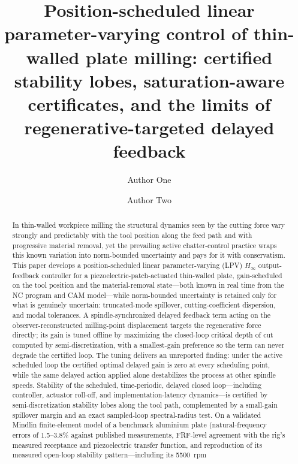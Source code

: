 \documentclass[preprint,12pt]{elsarticle}
\newcommand{\hinf}{H_\infty}
\begin{document}
\begin{frontmatter}

\title{Position-scheduled linear parameter-varying control of
thin-walled plate milling: certified stability lobes,
saturation-aware certificates, and the limits of
regenerative-targeted delayed feedback}

\author{Author One}
\author{Author Two}

\begin{abstract}
In thin-walled workpiece milling the structural dynamics seen by the
cutting force vary strongly and predictably with the tool position along
the feed path and with progressive material removal, yet the prevailing
active chatter-control practice wraps this known variation into
norm-bounded uncertainty and pays for it with conservatism. This paper
develops a position-scheduled linear parameter-varying (LPV) $\hinf$
output-feedback controller for a piezoelectric-patch-actuated thin-walled
plate, gain-scheduled on the tool position and the material-removal
state---both known in real time from the NC program and CAM model---while
norm-bounded uncertainty is retained only for what is genuinely
uncertain: truncated-mode spillover, cutting-coefficient dispersion, and
modal tolerances. A spindle-synchronized delayed feedback term acting on
the observer-reconstructed milling-point displacement targets the
regenerative force directly; its gain is tuned offline by maximizing
the closed-loop critical depth of cut computed by semi-discretization,
with a smallest-gain preference so the term can never degrade the
certified loop. The tuning delivers an unreported finding: under the
active scheduled loop the certified optimal delayed gain is zero at
every scheduling point, while the same delayed action applied alone
destabilizes the process at other spindle speeds. Stability of the
scheduled,
time-periodic, delayed closed loop---including controller, actuator
roll-off, and implementation-latency dynamics---is certified by
semi-discretization stability lobes along the tool path, complemented by
a small-gain spillover margin and an exact sampled-loop spectral-radius
test. On a validated Mindlin finite-element model of a benchmark
aluminium plate (natural-frequency errors of 1.5--3.8\% against
published measurements, FRF-level agreement with the rig's measured
receptance and piezoelectric transfer function, and reproduction of
its measured open-loop stability pattern---including its 5500~rpm

\end{abstract}
\end{frontmatter}
\end{document}
